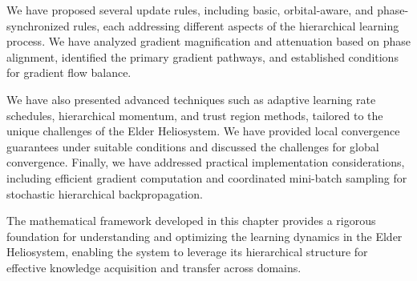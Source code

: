 We have proposed several update rules, including basic, orbital-aware, and phase-synchronized rules, each addressing different aspects of the hierarchical learning process. We have analyzed gradient magnification and attenuation based on phase alignment, identified the primary gradient pathways, and established conditions for gradient flow balance.

We have also presented advanced techniques such as adaptive learning rate schedules, hierarchical momentum, and trust region methods, tailored to the unique challenges of the Elder Heliosystem. We have provided local convergence guarantees under suitable conditions and discussed the challenges for global convergence. Finally, we have addressed practical implementation considerations, including efficient gradient computation and coordinated mini-batch sampling for stochastic hierarchical backpropagation.

The mathematical framework developed in this chapter provides a rigorous foundation for understanding and optimizing the learning dynamics in the Elder Heliosystem, enabling the system to leverage its hierarchical structure for effective knowledge acquisition and transfer across domains.
